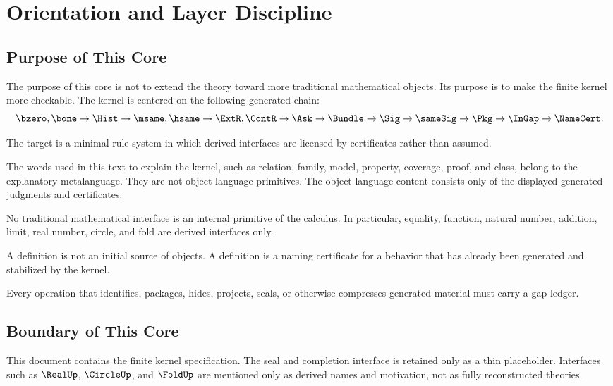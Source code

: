 \chapter{Orientation and Layer Discipline}
\label{ch:core-orientation-and-layer-discipline}

\section{Purpose of This Core}
The purpose of this core is not to extend the theory toward more traditional mathematical objects. Its purpose is to make the finite kernel more checkable. The kernel is centered on the following generated chain:
$$
\bzero,\bone
\to \Hist
\to \msame,\hsame
\to \ExtR,\ContR
\to \Ask
\to \Bundle
\to \Sig
\to \sameSig
\to \Pkg
\to \InGap
\to \NameCert.
$$

The target is a minimal rule system in which derived interfaces are licensed by certificates rather than assumed.

\begin{principle}
\label{prin:layer-isolation}
The words used in this text to explain the kernel, such as relation, family, model, property, coverage, proof, and class, belong to the explanatory metalanguage. They are not object-language primitives. The object-language content consists only of the displayed generated judgments and certificates.
\end{principle}

\begin{principle}
\label{prin:no-inherited-mathematical-primitives}
No traditional mathematical interface is an internal primitive of the calculus. In particular, equality, function, natural number, addition, limit, real number, circle, and fold are derived interfaces only.
\end{principle}

\begin{principle}
\label{prin:definition-demotion}
A definition is not an initial source of objects. A definition is a naming certificate for a behavior that has already been generated and stabilized by the kernel.
\end{principle}

\begin{principle}
\label{prin:compression-requires-memory}
Every operation that identifies, packages, hides, projects, seals, or otherwise compresses generated material must carry a gap ledger.
\end{principle}

\section{Boundary of This Core}
This document contains the finite kernel specification. The seal and completion interface is retained only as a thin placeholder. Interfaces such as \(\RealUp\), \(\CircleUp\), and \(\FoldUp\) are mentioned only as derived names and motivation, not as fully reconstructed theories.

